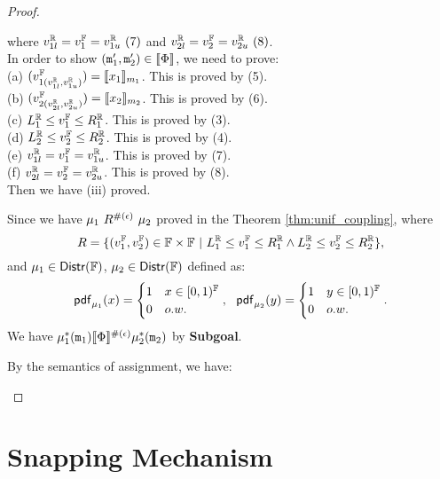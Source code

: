 \documentclass[a4paper,11pt]{article}
\begin{document}
\begin{proof}
\begin{itemize}
\begin{subproof}
	where $v^{\mathbb{R}}_{1l} = v^{\mathbb{F}}_1 = v^{\mathbb{R}}_{1u} ~ (7)$ and $v^{\mathbb{R}}_{2l} = v^{\mathbb{F}}_2 = v^{\mathbb{R}}_{2u} ~ (8)$.
	\\
	In order to show $(\mathtt{m}_1', \mathtt{m}_2') \in \llbracket \Phi \rrbracket$, we need to prove:
	\\
	(a)	$(v^{\mathbb{F}}_{1(v^{\mathbb{R}}_{1l}, v^{\mathbb{R}}_{1u})}) = \llbracket x_1 \rrbracket_{m_1}$.
	This is proved by (5).
	\\
	(b) $(v^{\mathbb{F}}_{2(v^{\mathbb{R}}_{2l}, v^{\mathbb{R}}_{2u})}) = \llbracket x_2 \rrbracket_{m_2}$.
	This is proved by (6).
	\\
	(c) $L^{\mathbb{R}}_1 \leq v^{\mathbb{F}}_1 \leq R^{\mathbb{R}}_1$.
	This is proved by (3).
	\\
	(d) $L^{\mathbb{R}}_2 \leq v^{\mathbb{F}}_2 \leq R^{\mathbb{R}}_2$.
	This is proved by (4).
	\\
	(e) $v^{\mathbb{R}}_{1l} = v^{\mathbb{F}}_1 = v^{\mathbb{R}}_{1u}$.
	This is proved by (7).
	\\ 
	(f) $v^{\mathbb{R}}_{2l} = v^{\mathbb{F}}_2 = v^{\mathbb{R}}_{2u}$.
	This is proved by (8).
	\\
	Then we have (iii) proved. 
	\end{subproof}
	Since we have ${\mu_1} ~ R^{\#(\epsilon)} ~ {\mu_2}$ proved in the Theorem \ref{thm:unif_coupling},
	where 
	\[ R = 
			\{(v^{\mathbb{F}}_1, v^{\mathbb{F}}_2) \in \mathbb{F} \times \mathbb{F} 
			~|~
			L^{\mathbb{R}}_1 \leq v^{\mathbb{F}}_1 \leq R^{\mathbb{R}}_1 
			\land 
			L^{\mathbb{R}}_2 \leq v^{\mathbb{F}}_2 \leq R^{\mathbb{R}}_2
			\},
	\]
	and ${\mu_1} \in \mathsf{Distr}(\mathbb{F})$, ${\mu_2} \in \mathsf{Distr}(\mathbb{F})$ defined as:
	\[
		\mathsf{pdf}_{\mu_1}(x) = 
		\begin{cases}
		1 & x \in [0, 1)^{\mathbb{F}} 
		\\
		0       & o.w.
		\end{cases} ,
		~~
		\mathsf{pdf}_{\mu_2}(y) = 
		\begin{cases}
		1 & y \in [0, 1)^{\mathbb{F}}
		\\
		0       & o.w.
		\end{cases}.
	\]	
	We have $\mu^*_1(\mathtt{m}_1) \llbracket \Phi \rrbracket^{\#(\epsilon)} \mu^*_2(\mathtt{m}_2)$ by \textbf{Subgoal}.



	By the semantics of assignment, we have:\\
	\end{itemize}
\end{proof}


\newpage
\section{Snapping Mechanism}
\end{document}

